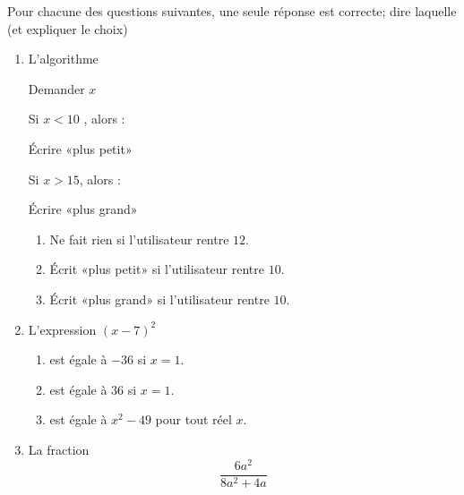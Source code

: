 
\begin{exercice}[\ldots/4]\label{exosmath-0635}

    Pour chacune des questions suivantes, une seule réponse est correcte; dire laquelle (et expliquer le choix)
    \begin{multicols}{2}
    \begin{enumerate}
        \item
           L'algorithme

    \begin{fmpage}{0.9\linewidth}

    Demander \( x\)

    Si  \( x< 10\) , alors :

    \hspace{0.5cm} Écrire «plus petit» 

    Si \( x>15\), alors :

    \hspace{0.5cm} Écrire «plus grand» 

\end{fmpage}

    \begin{enumerate}
        \item
            Ne fait rien si l'utilisateur rentre \( 12\).
        \item
            Écrit «plus petit»  si l'utilisateur rentre \( 10\).
        \item
            Écrit «plus grand» si l'utilisateur rentre \( 10\).
    \end{enumerate}
    
\item

    L'expression \( (x-7)^2\)
    \begin{enumerate}
        \item
            est égale à \( -36\) si \( x=1\).
        \item
            est égale à \( 36\) si \( x=1\).
        \item
            est égale à \( x^2-49\) pour tout réel \( x\).
    \end{enumerate}
    
\item

    La fraction
    \begin{equation*}
        \frac{ 6a^2 }{ 8a^2+4a }
    \end{equation*}
    

\end{enumerate}
\end{multicols}
\end{exercice}
